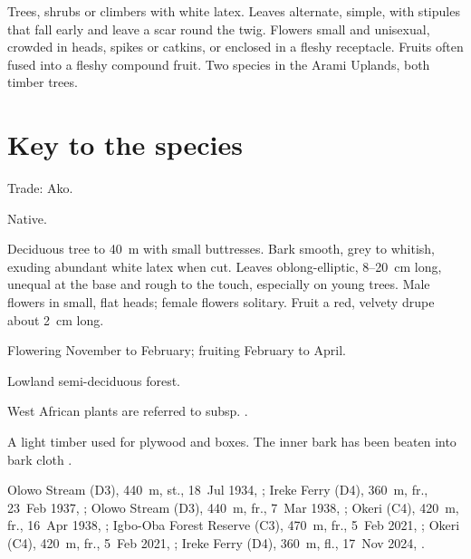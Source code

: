 \label{fam:moraceae}

Trees, shrubs or climbers with white latex. Leaves alternate, simple,
with stipules that fall early and leave a scar round the twig. Flowers
small and unisexual, crowded in heads, spikes or catkins, or enclosed
in a fleshy receptacle. Fruits often fused into a fleshy compound
fruit. Two species in the Arami Uplands, both timber trees.

\section*{Key to the species}
\begin{florakey}
\end{florakey}

\label{sp:MOR01}

 

 Trade: Ako.

 Native.

 Deciduous tree to 40~m with small buttresses. Bark
smooth, grey to whitish, exuding abundant white latex when cut. Leaves
oblong-elliptic, 8--20~cm long, unequal at the base and rough to the
touch, especially on young trees. Male flowers in small, flat heads;
female flowers solitary. Fruit a red, velvety drupe about 2~cm long.

 Flowering November to February; fruiting February
to April.

 Lowland semi-deciduous forest.

 West African plants are referred to
 subsp. 
.

 A light timber used for plywood and boxes. The inner bark
has been beaten into bark cloth \citep{hawthorne2006,louppe2008}.

 Olowo Stream (D3), 440~m, st., 18~Jul 1934, ;
Ireke Ferry (D4), 360~m, fr., 23~Feb 1937, ;
Olowo Stream (D3), 440~m, fr., 7~Mar 1938, ;
Okeri (C4), 420~m, fr., 16~Apr 1938, ;
Igbo-Oba Forest Reserve (C3), 470~m, fr., 5~Feb 2021, ;
Okeri (C4), 420~m, fr., 5~Feb 2021, ;
Ireke Ferry (D4), 360~m, fl., 17~Nov 2024, .


